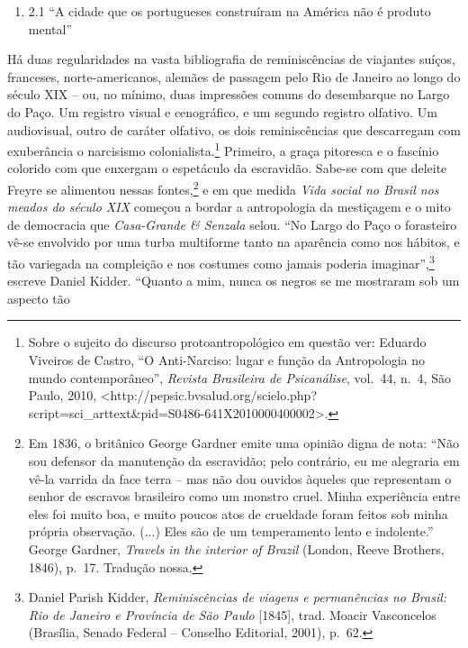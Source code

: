 \begin{enumerate}
\def\labelenumi{\arabic{enumi}.}
\setcounter{enumi}{2}
\tightlist
\item
  2.1 ``A cidade que os portugueses construíram na América não é produto
  mental''
\end{enumerate}

Há duas regularidades na vasta bibliografia de reminiscências de
viajantes suíços, franceses, norte-americanos, alemães de passagem pelo
Rio de Janeiro ao longo do século XIX -- ou, no mínimo, duas impressões
comuns do desembarque no Largo do Paço. Um registro visual e
cenográfico, e um segundo registro olfativo. Um audiovisual, outro de
caráter olfativo, os dois reminiscências que descarregam com exuberância
o narcisismo colonialista.\footnote{Sobre o sujeito do discurso
  protoantropológico em questão ver: Eduardo Viveiros de Castro, ``O
  Anti-Narciso: lugar e função da Antropologia no mundo contemporâneo'',
  \emph{Revista Brasileira de Psicanálise}, vol.~44, n.~4, São Paulo,
  2010,
  \textless{}http://pepsic.bvsalud.org/scielo.php?script=sci\_arttext\&pid=S0486-641X2010000400002\textgreater{}.}
Primeiro, a graça pitoresca e o fascínio colorido com que enxergam o
espetáculo da escravidão. Sabe-se com que deleite Freyre se alimentou
nessas fontes,\footnote{Em 1836, o britânico George Gardner emite uma
  opinião digna de nota: ``Não sou defensor da manutenção da escravidão;
  pelo contrário, eu me alegraria em vê-la varrida da face terra -- mas
  não dou ouvidos àqueles que representam o senhor de escravos
  brasileiro como um monstro cruel. Minha experiência entre eles foi
  muito boa, e muito poucos atos de crueldade foram feitos sob minha
  própria observação. (...) Eles são de um temperamento lento e
  indolente.'' George Gardner, \emph{Travels in the interior of Brazil}
  (London, Reeve Brothers, 1846), p.~17. Tradução nossa.} e em que
medida \emph{Vida social no Brasil nos meados do século XIX} começou a
bordar a antropologia da mestiçagem e o mito de democracia que
\emph{Casa-Grande \& Senzala} selou. ``No Largo do Paço o forasteiro
vê-se envolvido por uma turba multiforme tanto na aparência como nos
hábitos, e tão variegada na compleição e nos costumes como jamais
poderia imaginar'',\footnote{Daniel Parish Kidder, \emph{Reminiscências
  de viagens e permanências no Brasil: Rio de Janeiro e Província de São
  Paulo} {[}1845{]}, trad. Moacir Vasconcelos (Brasília, Senado Federal
  -- Conselho Editorial, 2001), p.~62.} escreve Daniel Kidder. ``Quanto
a mim, nunca os negros se me mostraram sob um aspecto tão
